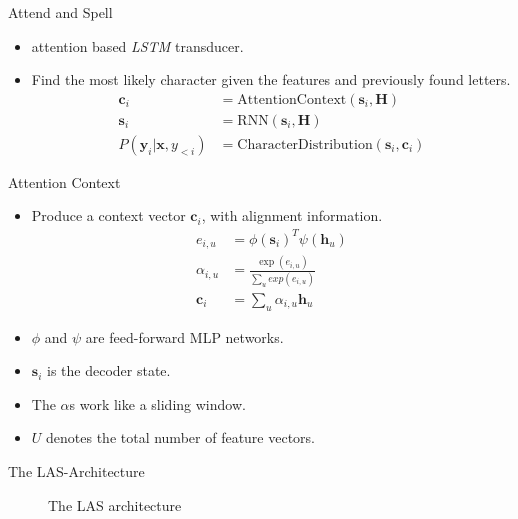 \documentclass{beamer}
\begin{document}
\begin{frame}{Attend and Spell}
\begin{itemize}
	\item attention based \textit{LSTM} transducer.
	\item Find the most likely character given the features and previously found letters.
		  \begin{align}
			\mathbf{c}_i &= \text{AttentionContext}(\mathbf{s}_i,\mathbf{H}) \\
			\mathbf{s}_i &= \text{RNN}(\mathbf{s}_i,\mathbf{H}) \\
			P(\mathbf{y}_i|\mathbf{x},y_{<i}) &= \text{CharacterDistribution}(\mathbf{s}_i,\mathbf{c}_{i})
		  \end{align}

\end{itemize}
\end{frame}
\begin{frame}{Attention Context}
	\begin{itemize}
		\item Produce a context vector $\mathbf{c}_i$, with alignment information.
			  \begin{align}
			  	e_{i,u} &= \phi(\mathbf{s}_i)^T \psi(\mathbf{h}_u) \\
			  	\alpha_{i,u} &= \frac{\exp(e_{i,u})}{\sum_u exp(e_{i,u})} \\
			  	\mathbf{c}_i &= \sum\limits_{u} \alpha_{i,u}\mathbf{h}_u 
			  \end{align}
		\item $\phi$ and $\psi$ are feed-forward MLP networks.
		\item $\mathbf{s}_i$ is the decoder state.
		\item The $\alpha$s work like a sliding window.
		\item $U$ denotes the total number of feature vectors.
	\end{itemize}
\end{frame}

\begin{frame}{The LAS-Architecture}
\begin{figure}

\caption{The LAS architecture}
\label{fig:las}
\end{figure}
\end{frame}
\end{document}
